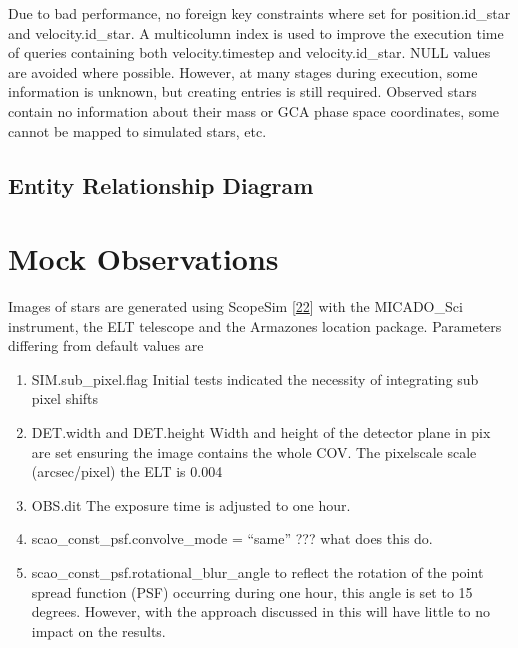 \documentclass[letterpaper,10pt,english]{sphinxmanual}
\begin{document}
\sphinxAtStartPar
Due to bad performance, no foreign key constraints where set for position.id\_star and velocity.id\_star.
A multi\sphinxhyphen{}column index is used to improve the execution time of queries containing both velocity.timestep and velocity.id\_star.
NULL values are avoided where possible. However, at many stages during execution, some information is unknown, but creating entries is still required.
Observed stars contain no information about their mass or GCA phase space coordinates, some cannot be mapped to simulated stars, etc.


\section{Entity Relationship Diagram}
\label{\detokenize{NBodySimulation/Database:entity-relationship-diagram}}
\noindent{}


\chapter{Mock Observations}
\label{\detokenize{NBodySimulation/MockObservations:mock-observations}}\label{\detokenize{NBodySimulation/MockObservations::doc}}
\sphinxAtStartPar
Images of stars are generated using ScopeSim {[}\hyperlink{cite.NBodySimulation/Appendix:id50}{22}{]} with the MICADO\_Sci instrument, the ELT telescope and the Armazones location package.
Parameters differing from default values are
\begin{enumerate}
%
\item {} 
\sphinxAtStartPar
SIM.sub\_pixel.flag \sphinxhyphen{} Initial tests indicated the necessity of integrating sub pixel shifts

\item {} 
\sphinxAtStartPar
DET.width and DET.height \sphinxhyphen{} Width and height of the detector plane in pix are set ensuring the image contains the whole COV. The pixelscale scale (arcsec/pixel) the ELT is 0.004

\item {} 
\sphinxAtStartPar
OBS.dit \sphinxhyphen{} The exposure time is adjusted to one hour.

\item {} 
\sphinxAtStartPar
scao\_const\_psf.convolve\_mode = “same” ??? what does this do.

\item {} 
\sphinxAtStartPar
scao\_const\_psf.rotational\_blur\_angle \sphinxhyphen{} to reflect the rotation of the point spread function (PSF) occurring during one hour, this angle is set to 15 degrees. However, with the approach discussed in {\hyperref[\detokenize{NBodySimulation/DataReduction:masking-bright-stars-label}]{}} this will have little to no impact on the results.

\end{enumerate}
\end{document}
